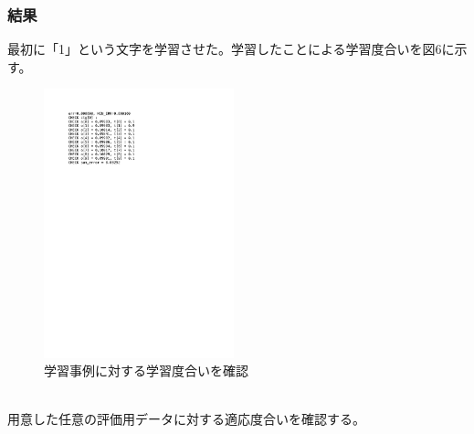 \subsubsection{結果}
最初に「1」という文字を学習させた。学習したことによる学習度合いを図6に示す。\\
\begin{figure}[htbp]
  \begin{center}
    \includegraphics[clip,width=5.5cm]{./lebel3-3figs/c.pdf}
    \caption{学習事例に対する学習度合いを確認}
  \end{center}
\end{figure}
\\用意した任意の評価用データに対する適応度合いを確認する。
